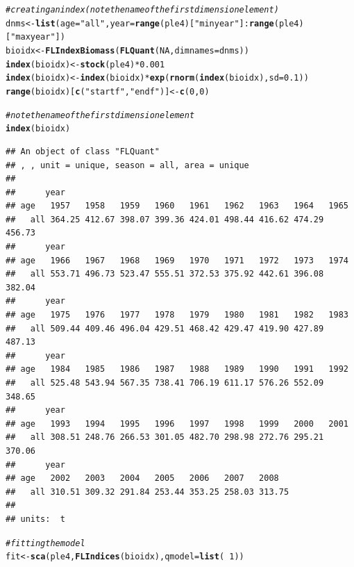 \documentclass[a4paper,english,10pt]{article}\usepackage[]{graphicx}\usepackage[]{color}
\makeatletter
\newcommand{\hlnum}[1]{\textcolor[rgb]{0.686,0.059,0.569}{#1}}%
\newcommand{\hlstr}[1]{\textcolor[rgb]{0.192,0.494,0.8}{#1}}%
\newcommand{\hlcom}[1]{\textcolor[rgb]{0.678,0.584,0.686}{\textit{#1}}}%
\newcommand{\hlopt}[1]{\textcolor[rgb]{0,0,0}{#1}}%
\newcommand{\hlstd}[1]{\textcolor[rgb]{0.345,0.345,0.345}{#1}}%
\newcommand{\hlkwb}[1]{\textcolor[rgb]{0.69,0.353,0.396}{#1}}%
\newcommand{\hlkwc}[1]{\textcolor[rgb]{0.333,0.667,0.333}{#1}}%
\newcommand{\hlkwd}[1]{\textcolor[rgb]{0.737,0.353,0.396}{\textbf{#1}}}%
\newenvironment{kframe}{%
 \def\at@end@of@kframe{}%
 \ifinner\ifhmode%
  \def\at@end@of@kframe{\end{minipage}}%
  \begin{minipage}{\columnwidth}%
 \fi\fi%
 \def\FrameCommand##1{\hskip\@totalleftmargin \hskip-\fboxsep
 \colorbox{shadecolor}{##1}\hskip-\fboxsep
     \hskip-\linewidth \hskip-\@totalleftmargin \hskip\columnwidth}%
 \MakeFramed {\advance\hsize-\width
   \@totalleftmargin\z@ \linewidth\hsize
   \@setminipage}}%
 {\par\unskip\endMakeFramed%
 \at@end@of@kframe}
\newenvironment{knitrout}{}{} %
\makeatother
\begin{document}
\begin{knitrout}
\color{fgcolor}\begin{kframe}
\begin{alltt}
\hlcom{# creating an index (note the name of the first dimension element)}
\hlstd{dnms} \hlkwb{<-} \hlkwd{list}\hlstd{(}\hlkwc{age} \hlstd{=} \hlstr{"all"}\hlstd{,} \hlkwc{year} \hlstd{=} \hlkwd{range}\hlstd{(ple4)[}\hlstr{"minyear"}\hlstd{]}\hlopt{:}\hlkwd{range}\hlstd{(ple4)[}\hlstr{"maxyear"}\hlstd{])}
\hlstd{bioidx} \hlkwb{<-} \hlkwd{FLIndexBiomass}\hlstd{(}\hlkwd{FLQuant}\hlstd{(}\hlnum{NA}\hlstd{,} \hlkwc{dimnames} \hlstd{= dnms))}
\hlkwd{index}\hlstd{(bioidx)} \hlkwb{<-} \hlkwd{stock}\hlstd{(ple4)} \hlopt{*} \hlnum{0.001}
\hlkwd{index}\hlstd{(bioidx)} \hlkwb{<-} \hlkwd{index}\hlstd{(bioidx)} \hlopt{*} \hlkwd{exp}\hlstd{(}\hlkwd{rnorm}\hlstd{(}\hlkwd{index}\hlstd{(bioidx),} \hlkwc{sd} \hlstd{=} \hlnum{0.1}\hlstd{))}
\hlkwd{range}\hlstd{(bioidx)[}\hlkwd{c}\hlstd{(}\hlstr{"startf"}\hlstd{,} \hlstr{"endf"}\hlstd{)]} \hlkwb{<-} \hlkwd{c}\hlstd{(}\hlnum{0}\hlstd{,} \hlnum{0}\hlstd{)}

\hlcom{# note the name of the first dimension element}
\hlkwd{index}\hlstd{(bioidx)}
\end{alltt}
\begin{verbatim}
## An object of class "FLQuant"
## , , unit = unique, season = all, area = unique
## 
##      year
## age   1957   1958   1959   1960   1961   1962   1963   1964   1965  
##   all 364.25 412.67 398.07 399.36 424.01 498.44 416.62 474.29 456.73
##      year
## age   1966   1967   1968   1969   1970   1971   1972   1973   1974  
##   all 553.71 496.73 523.47 555.51 372.53 375.92 442.61 396.08 382.04
##      year
## age   1975   1976   1977   1978   1979   1980   1981   1982   1983  
##   all 509.44 409.46 496.04 429.51 468.42 429.47 419.90 427.89 487.13
##      year
## age   1984   1985   1986   1987   1988   1989   1990   1991   1992  
##   all 525.48 543.94 567.35 738.41 706.19 611.17 576.26 552.09 348.65
##      year
## age   1993   1994   1995   1996   1997   1998   1999   2000   2001  
##   all 308.51 248.76 266.53 301.05 482.70 298.98 272.76 295.21 370.06
##      year
## age   2002   2003   2004   2005   2006   2007   2008  
##   all 310.51 309.32 291.84 253.44 353.25 258.03 313.75
## 
## units:  t
\end{verbatim}
\begin{alltt}
\hlcom{# fitting the model}
\hlstd{fit} \hlkwb{<-} \hlkwd{sca}\hlstd{(ple4,} \hlkwd{FLIndices}\hlstd{(bioidx),} \hlkwc{qmodel} \hlstd{=} \hlkwd{list}\hlstd{(}\hlopt{~}\hlnum{1}\hlstd{))}
\end{alltt}
\end{kframe}
\end{knitrout}
\end{document}
